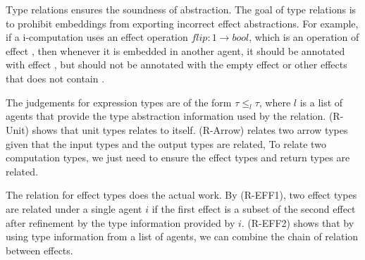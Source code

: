 Type relations ensures the soundness of abstraction. The goal of type relations is to prohibit embeddings from exporting incorrect effect abstractions. For example, if a i-computation uses an effect operation $flip : 1 \rightarrow bool$, which is an operation of effect , then whenever it is embedded in another agent, it should be annotated with effect , but should not  be annotated with the empty effect or other effects that does not contain .

The judgements for expression types are of the form $\tau \leq_l \tau$, where $l$ is a list of agents that provide the type abstraction information used by the relation. (R-Unit) shows that unit types relates to itself. (R-Arrow) relates two arrow types given that the input types and the output types are related,  To relate two computation types, we just need to ensure the effect types and return types are related. 

The relation for effect types does the actual work. By (R-EFF1), two effect types are related under a single agent $i$ if the first effect is a subset of the second effect after refinement by the type information provided by $i$. (R-EFF2) shows that by using type information from a list of agents, we can combine the chain of relation between effects.

